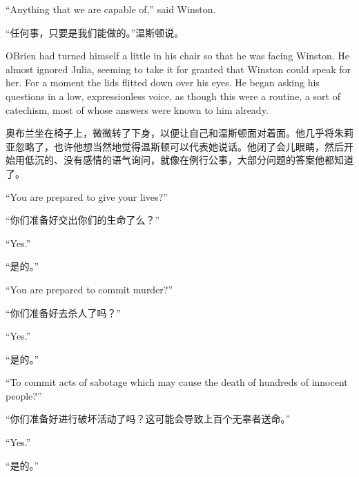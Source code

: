 \begin{paracol}{2}
\switchcolumn*

``Anything that we are capable of,'' said Winston.

\switchcolumn

``任何事，只要是我们能做的。''温斯顿说。

\switchcolumn*

O\textquotesingle Brien had turned himself a little in his chair so that
he was facing Winston. He almost ignored Julia, seeming to take it for
granted that Winston could speak for her. For a moment the lids flitted
down over his eyes. He began asking his questions in a low,
expressionless voice, as though this were a routine, a sort of
catechism, most of whose answers were known to him already.

\switchcolumn

奥布兰坐在椅子上，微微转了下身，以便让自己和温斯顿面对着面。他几乎将朱莉亚忽略了，也许他想当然地觉得温斯顿可以代表她说话。他闭了会儿眼睛，然后开始用低沉的、没有感情的语气询问，就像在例行公事，大部分问题的答案他都知道了。

\switchcolumn*

``You are prepared to give your lives?''

\switchcolumn

``你们准备好交出你们的生命了么？''

\switchcolumn*

``Yes.''

\switchcolumn

``是的。''

\switchcolumn*

``You are prepared to commit murder?''

\switchcolumn

``你们准备好去杀人了吗？''

\switchcolumn*

``Yes.''

\switchcolumn

``是的。''

\switchcolumn*

``To commit acts of sabotage which may cause the death of hundreds of
innocent people?''

\switchcolumn

``你们准备好进行破坏活动了吗？这可能会导致上百个无辜者送命。''

\switchcolumn*

``Yes.''

\switchcolumn

``是的。''


\end{paracol}
